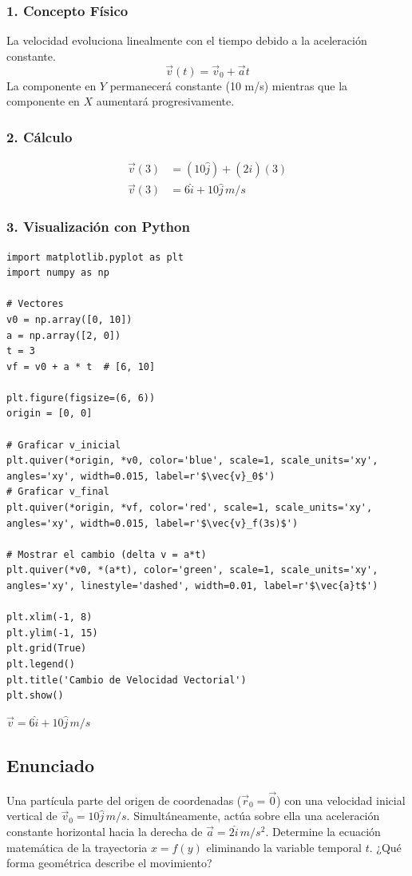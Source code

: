\documentclass[12pt, a4paper]{article}
\begin{document}
\subsubsection*{1. Concepto Físico}
La velocidad evoluciona linealmente con el tiempo debido a la aceleración constante.
$$ \vec{v}(t) = \vec{v}_0 + \vec{a}t $$
La componente en $Y$ permanecerá constante (10 m/s) mientras que la componente en $X$ aumentará progresivamente.

\subsubsection*{2. Cálculo}
\begin{align*}
    \vec{v}(3) &= (10\hat{j}) + (2\hat{i})(3) \\
    \vec{v}(3) &= 6\hat{i} + 10\hat{j} \, \si{m/s}
\end{align*}

\subsubsection*{3. Visualización con Python}
\begin{verbatim}
import matplotlib.pyplot as plt
import numpy as np

# Vectores
v0 = np.array([0, 10])
a = np.array([2, 0])
t = 3
vf = v0 + a * t  # [6, 10]

plt.figure(figsize=(6, 6))
origin = [0, 0]

# Graficar v_inicial
plt.quiver(*origin, *v0, color='blue', scale=1, scale_units='xy', angles='xy', width=0.015, label=r'$\vec{v}_0$')
# Graficar v_final
plt.quiver(*origin, *vf, color='red', scale=1, scale_units='xy', angles='xy', width=0.015, label=r'$\vec{v}_f(3s)$')

# Mostrar el cambio (delta v = a*t)
plt.quiver(*v0, *(a*t), color='green', scale=1, scale_units='xy', angles='xy', linestyle='dashed', width=0.01, label=r'$\vec{a}t$')

plt.xlim(-1, 8)
plt.ylim(-1, 15)
plt.grid(True)
plt.legend()
plt.title('Cambio de Velocidad Vectorial')
plt.show()
\end{verbatim}

\begin{tcolorbox}[colback=green!5!white, colframe=green!50!black, title=Respuesta Final]
\centering \Large $\vec{v} = 6\hat{i} + 10\hat{j} \, \si{m/s}$
\end{tcolorbox}

\newpage

\subsection*{Enunciado}
Una partícula parte del origen de coordenadas ($\vec{r}_0 = \vec{0}$) con una velocidad inicial vertical de $\vec{v}_0 = 10\hat{j} \, \si{m/s}$. Simultáneamente, actúa sobre ella una aceleración constante horizontal hacia la derecha de $\vec{a} = 2\hat{i} \, \si{m/s^2}$. Determine la ecuación matemática de la trayectoria $x = f(y)$ eliminando la variable temporal $t$. ¿Qué forma geométrica describe el movimiento?
\end{document}
